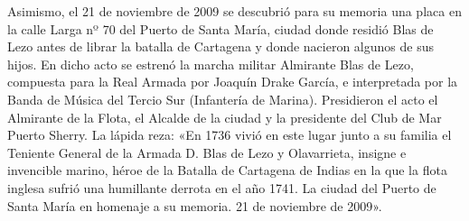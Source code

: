 Asimismo, el 21 de noviembre de 2009 se descubrió para su memoria una
placa en la calle Larga nº 70 del Puerto de Santa María, ciudad donde
residió Blas de Lezo antes de librar la batalla de Cartagena y donde
nacieron algunos de sus hijos. En dicho acto se estrenó la marcha
militar Almirante Blas de Lezo, compuesta para la Real Armada por
Joaquín Drake García, e interpretada por la Banda de Música del Tercio
Sur (Infantería de Marina). Presidieron el acto el Almirante de la
Flota, el Alcalde de la ciudad y la presidente del Club de Mar Puerto
Sherry. La lápida reza: «En 1736 vivió en este lugar junto a su
familia el Teniente General de la Armada D. Blas de Lezo y
Olavarrieta, insigne e invencible marino, héroe de la Batalla de
Cartagena de Indias en la que la flota inglesa sufrió una humillante
derrota en el año 1741. La ciudad del Puerto de Santa María en
homenaje a su memoria. 21 de noviembre de 2009».
